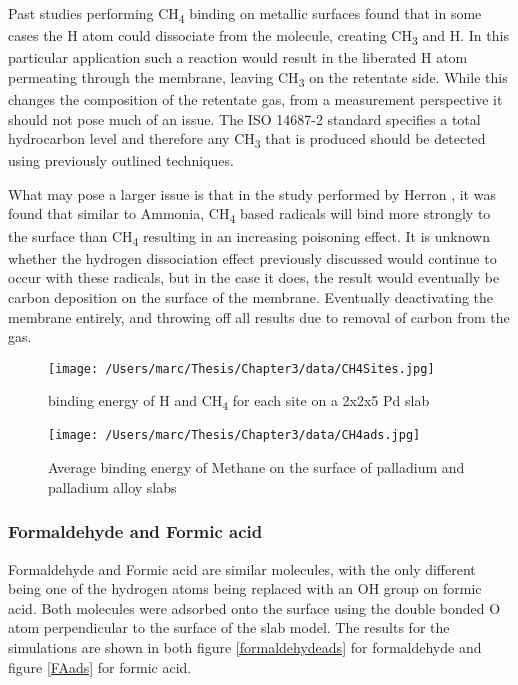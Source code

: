 Past studies performing CH\textsubscript{4} binding on metallic surfaces found that in some cases the H atom could dissociate from the molecule, creating CH\textsubscript{3} and H. \cite{doi:10.1021/acs.jpcc.8b03184} In this particular application such a reaction would result in the liberated H atom permeating through the membrane, leaving CH\textsubscript{3} on the retentate side. While this changes the composition of the retentate gas, from a measurement perspective it should not pose much of an issue. The ISO 14687-2\cite{InternationalStandardISO14687-2:20122012} standard specifies a total hydrocarbon level and therefore any CH\textsubscript{3} that is produced should be detected using previously outlined techniques. \cite{Murugan2015}

What may pose a larger issue is that in the study performed by Herron \cite{HERRON20121670}, it was found that similar to Ammonia, CH\textsubscript{4} based radicals will bind more strongly to the surface than CH\textsubscript{4} resulting in an increasing poisoning effect. It is unknown whether the hydrogen dissociation effect previously discussed would continue to occur with these radicals, but in the case it does, the result would eventually be carbon deposition on the surface of the membrane. Eventually deactivating the membrane entirely, and throwing off all results due to removal of carbon from the gas.  

\begin{figure}
  \centering
  \texttt{[image: /Users/marc/Thesis/Chapter3/data/CH4Sites.jpg]}
  \caption{binding energy of H and CH\textsubscript{4} for each site on a 2x2x5 Pd slab}
  \label{CH4site}
\end{figure}

\begin{landscape}
  \begin{figure}
      \centering
      \texttt{[image: /Users/marc/Thesis/Chapter3/data/CH4ads.jpg]}
      \caption{Average binding energy of Methane on the surface of palladium and palladium alloy slabs}
      \label{CH4ads}
    \end{figure}
  
  \end{landscape}
\subsubsection{Formaldehyde and Formic acid}

Formaldehyde and Formic acid are similar molecules, with the only different being one of the hydrogen atoms being replaced with an OH group on formic acid. Both molecules were adsorbed onto the surface using the double bonded O atom perpendicular to the surface of the slab model.\cite{C8RA04983A} The results for the simulations are shown in both figure \ref{formaldehydeads} for formaldehyde and figure \ref{FAads} for formic acid. 

